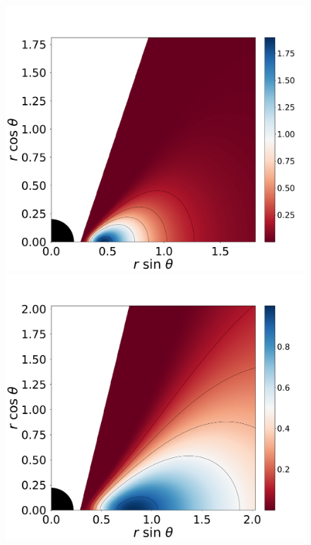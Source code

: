 \documentclass[twocolumn,aps,showpacs,showkeys,prd,superscriptaddress,byrevtex, amsmath]{revtex4-1}
\begin{document}
\begin{figure}
\includegraphics[scale=0.14]{figures/fig1_I__10.pdf}
\\
\includegraphics[scale=0.14]{figures/fig1_II_10.pdf}
\hspace{-0.3cm}

\end{figure}
\end{document}

